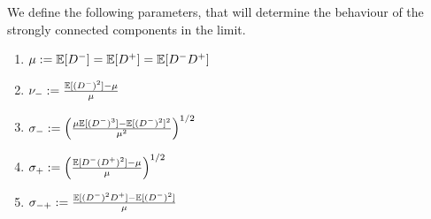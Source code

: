 We define the following parameters, that will determine the behaviour of the strongly connected components in the limit.
\begin{enumerate}
    \item $\mu:={\mathbb E}[D^-]={\mathbb E}[D^+]={\mathbb E}[D^-D^+]$
    \item $\nu_-:=\frac{{\mathbb E}[(D^-)^2]-\mu}{\mu}$ 
    \item $\sigma_-:=\left(\frac{\mu{\mathbb E}[(D^-)^3]-{\mathbb E}[(D^-)^2]^2}{\mu^2}\right)^{1/2}$ 
    \item $\sigma_+:=\left(\frac{{\mathbb E}[D^-(D^+)^2]-\mu}{\mu}\right)^{1/2}$ 
    \item $\sigma_{-+}:=\frac{{\mathbb E}[(D^-)^2D^+]-{\mathbb E}[(D^-)^2]}{\mu}$ 
\end{enumerate}
